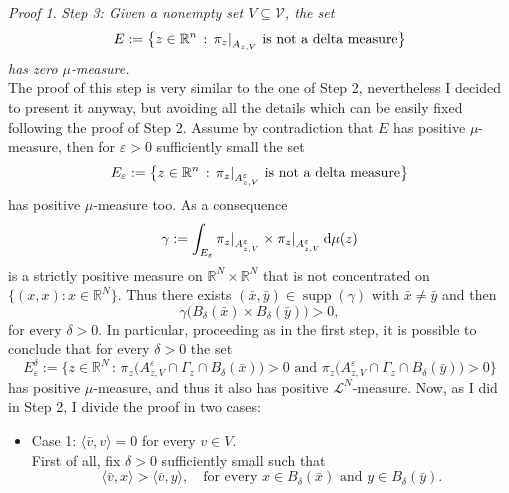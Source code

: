 \documentclass[11pt,twoside,a4paper]{article}
\DeclareMathOperator{\supp}{supp}
\newcommand{\scal}[2]{\ensuremath{\langle #1 , #2 \rangle}} %
\newcommand{\Leb}{\mathscr{L}}
\newcommand{\R}{\mathbb{R}}
\newcommand{\de}{\ensuremath{\, \mathrm d}} %
\newcommand{\suchthat}{\ensuremath{\,:\,}} %
\newcommand\restr[2]{{%
  \left.\kern-\nulldelimiterspace %
  #1 %
  \right|_{#2} %
  }}
\newcommand{\thmsymbol}{\( \square \)}
\theoremstyle{theorem}
\theoremstyle{definition}
\theoremstyle{remark}
\theoremstyle{proof}
\newtheorem*{pro}{Proof}
\newenvironment{pr}{\begin{pro}%
 \renewcommand{\qedsymbol}{\thmsymbol}\pushQED{\qed}}%
 {\popQED\end{pro}}
\begin{document}
\begin{pr}
\noindent  \textit{Step 3: Given a nonempty set $V \subseteq \mathcal V$, the set
\begin{equation*}
    E:= \big\{z\in \R^n \suchthat \restr{\pi_z}{A_{z,V}}\text{ is not a delta measure} \big\}
\end{equation*}
has zero $\mu$-measure.}\\
 The proof of this step is very similar to the one of Step 2, nevertheless I decided to present it anyway, but avoiding all the details which can be easily fixed following the proof of Step 2.
 Assume by contradiction that $E$ has positive $\mu$-measure, then for $\varepsilon>0$ sufficiently small the set
\begin{equation*}
    E_\varepsilon:= \big\{z\in \R^n \suchthat \restr{\pi_z}{A_{z,V}^\varepsilon}\text{ is not a delta measure} \big\}
\end{equation*}
has positive $\mu$-measure too. As a consequence 
\begin{equation*}
    \gamma:= \int_{E_\varepsilon} \restr{\pi_z}{A_{z,V}^\varepsilon} \times \restr{\pi_z}{A_{z,V}^\varepsilon} \de \mu (z)
\end{equation*}
is a strictly positive measure on $\R^N\times\R^N$ that is not concentrated on $\big\{(x,x):x\in \R^N\big\}$. Thus there exists $(\bar x, \bar y)\in \supp(\gamma)$ with $\bar x \ne \bar y$ and then 
\begin{equation*}
    \gamma \big( B_{\delta}(\bar x)\times B_{\delta}(\bar y)\big) >0,
\end{equation*}
for every $\delta>0$. In particular, proceeding as in the first step, it is possible to conclude that for every $\delta>0$ the set  
\begin{equation*}
    E_\varepsilon^\delta:= \big\{z\in \R^N \suchthat \pi_z\big(A_{z,V}^\varepsilon \cap \Gamma_z \cap B_{\delta}(\bar x)\big)>0 \text{ and } \pi_z\big(A_{z,V}^\varepsilon \cap \Gamma_z\cap B_{\delta}(\bar y)\big)>0 \big\}
\end{equation*}
has positive $\mu$-measure, and thus it also has positive $\Leb^N$-measure.
 Now, as I did in Step 2, I divide the proof in two cases:
\begin{itemize}
    \item Case 1: $\scal{\bar v}{v}=0$ for every $v \in V$.\\
    First of all, fix $\delta>0$ sufficiently small such that 
    \begin{equation*}
        \scal{\bar v}{x}> \scal{\bar v}{y}, \quad \text{for every } x \in B_\delta (\bar x) \text{ and } y \in B_\delta (\bar y). 

\end{equation*}
\end{itemize}
\end{pr}
\end{document}
